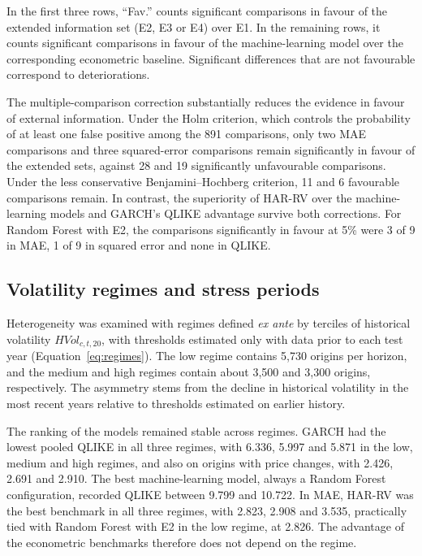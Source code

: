 \documentclass[a4paper,fleqn]{cas-sc}
\begin{document}
In the first three rows, ``Fav.'' counts significant comparisons in favour of the extended information set (E2, E3 or E4) over E1. In the remaining rows, it counts significant comparisons in favour of the machine-learning model over the corresponding econometric baseline. Significant differences that are not favourable correspond to deteriorations.

The multiple-comparison correction substantially reduces the evidence in favour of external information. Under the Holm criterion, which controls the probability of at least one false positive among the 891 comparisons, only two MAE comparisons and three squared-error comparisons remain significantly in favour of the extended sets, against 28 and 19 significantly unfavourable comparisons. Under the less conservative Benjamini--Hochberg criterion, 11 and 6 favourable comparisons remain. In contrast, the superiority of HAR-RV over the machine-learning models and GARCH's QLIKE advantage survive both corrections. For Random Forest with E2, the comparisons significantly in favour at 5\% were 3 of 9 in MAE, 1 of 9 in squared error and none in QLIKE.

\subsection{Volatility regimes and stress periods}
\label{subsec:results_regimes}

Heterogeneity was examined with regimes defined \textit{ex ante} by terciles of historical volatility \(HVol_{c,t,20}\), with thresholds estimated only with data prior to each test year (Equation~\ref{eq:regimes}). The low regime contains 5,730 origins per horizon, and the medium and high regimes contain about 3,500 and 3,300 origins, respectively. The asymmetry stems from the decline in historical volatility in the most recent years relative to thresholds estimated on earlier history.

The ranking of the models remained stable across regimes. GARCH had the lowest pooled QLIKE in all three regimes, with 6.336, 5.997 and 5.871 in the low, medium and high regimes, and also on origins with price changes, with 2.426, 2.691 and 2.910. The best machine-learning model, always a Random Forest configuration, recorded QLIKE between 9.799 and 10.722. In MAE, HAR-RV was the best benchmark in all three regimes, with 2.823, 2.908 and 3.535, practically tied with Random Forest with E2 in the low regime, at 2.826. The advantage of the econometric benchmarks therefore does not depend on the regime.
\end{document}
